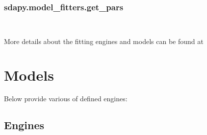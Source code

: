 \documentclass[letterpaper,10pt,english]{sphinxmanual}
\begin{document}
\begin{fulllineitems}
\label{\detokenize{generated/sdapy.model_fitters.get_model:sdapy.model_fitters.get_model}}~
\end{fulllineitems}



\subsubsection{sdapy.model\_fitters.get\_pars}
\label{\detokenize{generated/sdapy.model_fitters.get_pars:sdapy-model-fitters-get-pars}}\label{\detokenize{generated/sdapy.model_fitters.get_pars::doc}}

\begin{fulllineitems}
\label{\detokenize{generated/sdapy.model_fitters.get_pars:sdapy.model_fitters.get_pars}}~
\end{fulllineitems}


More details about the fitting engines and models can be found at {\hyperref[\detokenize{models:models}]{}}


\section{ \textendash{} Models}
\label{\detokenize{models:engines-and-models-models}}\label{\detokenize{models:models}}\label{\detokenize{models::doc}}
Below provide various of defined engines:


\subsection{Engines}
\label{\detokenize{models:engines}}
\end{document}
